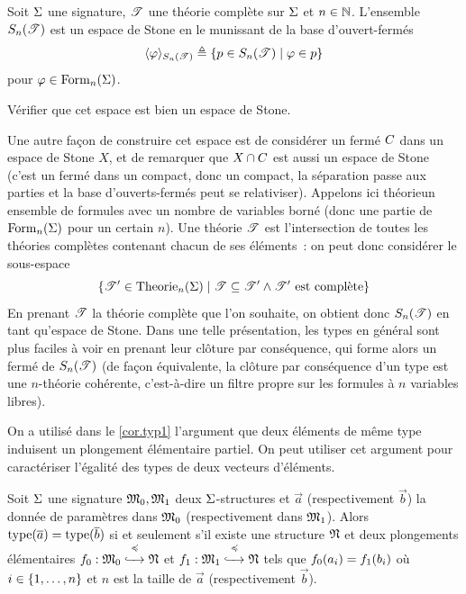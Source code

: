\begin{proposition}
  Soit $\Sigma$ une signature, $\mathscr T$ une théorie complète sur $\Sigma$ et
  $n \in \mathbb N$. L'ensemble $S_{n}(\mathscr T)$ est un espace de Stone en le
  munissant de la base d'ouvert-fermés
  \[\langle \varphi\rangle_{S_{n}(\mathscr T)} \triangleq
  \left\{ p\in S_{n}(\mathscr T) \;\middle\vert\; \varphi \in p \right\}\]
  pour $\varphi\in\operatorname{Form}_n(\Sigma)$.
\end{proposition}

\begin{exercise}
  Vérifier que cet espace est bien un espace de Stone.
\end{exercise}

\begin{remark}
  Une autre façon de construire cet espace est de considérer un fermé $C$
  dans un espace de Stone $X$, et de remarquer que $X\cap C$ est aussi un
  espace de Stone (c'est un fermé dans un compact, donc un compact, la
  séparation passe aux parties et la base d'ouverts-fermés peut se relativiser).
  Appelons ici \og théorie\fg un ensemble de formules avec un nombre de
  variables borné (donc une partie de $\operatorname{Form}_n(\Sigma)$ pour un certain $n$).
  Une théorie $\mathscr T$ est l'intersection de toutes les théories complètes
  contenant chacun de ses éléments~: on peut donc considérer le sous-espace
  \[
  \left\{ \mathscr T'\in\operatorname{Theorie}_n(\Sigma) \;\middle\vert\; \mathscr T\subseteq\mathscr T'\land
    \mathscr T'\text{ est complète} \right\}
  \]
  En prenant $\mathscr T$ la théorie complète que l'on souhaite, on obtient donc
  $S_{n}(\mathscr T)$ en tant qu'espace de Stone.
  Dans une telle présentation, les types en général sont plus faciles à voir
  en prenant leur clôture par conséquence, qui forme alors un fermé de
  $S_{n}(\mathscr T)$ (de façon équivalente, la clôture par conséquence d'un type
  est une $n$-théorie cohérente, c'est-à-dire un filtre propre sur les formules
  à $n$ variables libres).
\end{remark}

On a utilisé dans le \cref{cor.typ1} l'argument que deux éléments de même
type induisent un plongement élémentaire partiel. On peut utiliser cet argument
pour caractériser l'égalité des types de deux vecteurs d'éléments.

\begin{proposition}
  Soit $\Sigma$ une signature $\mathfrak{M}_0,\mathfrak{M}_1$ deux $\Sigma$-structures et
  $\vec a$ (respectivement $\vec b$) la donnée de paramètres dans $\mathfrak{M}_0$
  (respectivement dans $\mathfrak{M}_1$). Alors $\operatorname{type}(\overline{a}) = \operatorname{type}(\overline{b})$ si
  et seulement s'il existe une structure $\mathfrak{N}$ et deux plongements
  élémentaires $f_0 : \displaystyle \mathfrak{M}_0 \overset{\preccurlyeq}{\xhookrightarrow{\quad}} \mathfrak{N}$ et
  $f_1 : \displaystyle \mathfrak{M}_1 \overset{\preccurlyeq}{\xhookrightarrow{\quad}} \mathfrak{N}$ tels que
  $f_0(a_i) = f_1(b_i)$ où $i \in\{1,\ldots,n\}$ et $n$ est la
  taille de $\vec a$ (respectivement $\vec b$).
\end{proposition}

